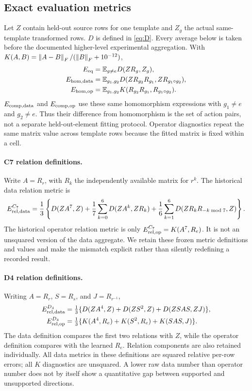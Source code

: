 \subsection{Exact evaluation metrics}
\label{app:metrics}
Let $Z$ contain held-out source rows for one template and $Z_g$ the actual same-template transformed rows. $D$ is defined in \cref{eq:D}. Every average below is taken before the documented higher-level experimental aggregation. With $K(A,B)=\left\lVert A-B\right\rVert_F/(\left\lVert B\right\rVert_F+10^{-12})$,
\begin{align*}
 E_{\mathrm{eq}}&=\mathbb{E}_{g\ne e}D(ZR_g,Z_g),\\
 E_{\mathrm{hom,data}}&=\mathbb{E}_{g_1,g_2}D(ZR_{g_2}R_{g_1},ZR_{g_1\circ g_2}),\\
 E_{\mathrm{hom,op}}&=\mathbb{E}_{g_1,g_2}K(R_{g_2}R_{g_1},R_{g_1\circ g_2}).
\end{align*}
$E_{\mathrm{comp,data}}$ and $E_{\mathrm{comp,op}}$ use these same homomorphism expressions with $g_1\ne e$ and $g_2\ne e$. Thus their difference from homomorphism is the set of action pairs, not a separate held-out-element fitting protocol. Operator diagnostics repeat the same matrix value across template rows because the fitted matrix is fixed within a cell.

\paragraph{C7 relation definitions.}
Write $A=R_r$, with $R_k$ the independently available matrix for $r^k$. The historical data relation metric is
\[
 E_{\mathrm{rel,data}}^{C_7}=\frac13\left\{
 D(ZA^7,Z)+\frac17\sum_{k=0}^6D(ZA^k,ZR_k)
 +\frac16\sum_{k=1}^6D(ZR_kR_{-k\bmod7},Z)\right\}.
\]
The historical operator relation metric is only $E_{\mathrm{rel,op}}^{C_7}=K(A^7,R_e)$. It is not an unsquared version of the data aggregate. We retain these frozen metric definitions and values and make the mismatch explicit rather than silently redefining a recorded result.

\paragraph{D4 relation definitions.}
Writing $A=R_r$, $S=R_s$, and $J=R_{r^{-1}}$,
\begin{align*}
 E_{\mathrm{rel,data}}^{D_4}&=\tfrac13\{D(ZA^4,Z)+D(ZS^2,Z)+D(ZSAS,ZJ)\},\\
 E_{\mathrm{rel,op}}^{D_4}&=\tfrac13\{K(A^4,R_e)+K(S^2,R_e)+K(SAS,J)\}.
\end{align*}
The data definition compares the first two relations with $Z$, while the operator definition compares with the learned $R_e$. Relation components are also retained individually. All data metrics in these definitions are squared relative per-row errors; all $K$ diagnostics are unsquared. A lower raw data number than operator number does not by itself show a quantitative gap between supported and unsupported directions.

